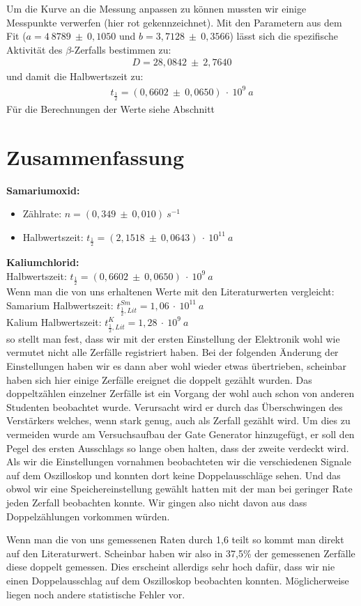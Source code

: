 \documentclass[12pt]{article}
\begin{document}
Um die Kurve an die Messung anpassen zu können mussten wir einige Messpunkte verwerfen (hier rot gekennzeichnet).
Mit den Parametern aus dem Fit ($a = 4~8789~\pm~0,1050$ und $b = 3,7128~\pm~0,3566$) lässt sich die spezifische Aktivität des $\beta$-Zerfalls bestimmen zu:
\begin{align*}
 D = 28,0842~\pm~2,7640
\end{align*}
und damit die Halbwertszeit zu:
\begin{align*}
 t_{\frac{1}{2}} = (0,6602~\pm~0,0650)~\cdot~10^9~a
\end{align*}
Für die Berechnungen der Werte siehe Abschnitt %
\newpage
\section{Zusammenfassung}
\textbf{Samariumoxid:} \\
\begin{itemize}
 \item Zählrate: $n = (0,349~\pm~0,010)~s^{-1}$
 \item Halbwertszeit: $t_{\frac{1}{2}} = (2,1518~\pm~0,0643)~\cdot~10^{11}~a$
\end{itemize}

\textbf{Kaliumchlorid:} \\
Halbwertszeit: $t_{\frac{1}{2}} = (0,6602~\pm~0,0650)~\cdot~10^9~a$\\

Wenn man die von uns erhaltenen Werte mit den Literaturwerten vergleicht:
Samarium Halbwertszeit: $t_{\frac{1}{2}, Lit}^{Sm} = 1,06~\cdot~10^{11}~a$\\
Kalium Halbwertszeit: $t_{\frac{1}{2}, Lit}^K = 1,28~\cdot~10^{9}~a$\\
so stellt man fest, dass wir mit der ersten Einstellung der Elektronik wohl wie vermutet nicht alle Zerfälle registriert haben. Bei der folgenden Änderung der Einstellungen haben wir es dann aber wohl wieder etwas übertrieben, scheinbar haben sich hier einige Zerfälle ereignet die doppelt gezählt wurden.
Das doppeltzählen einzelner Zerfälle ist ein Vorgang der wohl auch schon von anderen Studenten beobachtet wurde. Verursacht wird er durch das Überschwingen des Verstärkers welches, wenn stark genug, auch als Zerfall gezählt wird. Um dies zu vermeiden wurde am Versuchsaufbau der Gate Generator hinzugefügt, er soll den Pegel des ersten Ausschlags so lange oben halten, dass der zweite verdeckt wird. Als wir die Einstellungen vornahmen beobachteten wir die verschiedenen Signale auf dem Oszilloskop und konnten dort keine Doppelausschläge sehen. Und das obwol wir eine Speichereinstellung gewählt hatten mit der man bei geringer Rate jeden Zerfall beobachten konnte. Wir gingen also nicht davon aus dass Doppelzählungen vorkommen würden.

Wenn man die von uns gemessenen Raten durch 1,6 teilt so kommt man direkt auf den Literaturwert. Scheinbar haben wir also in 37,5\% der gemessenen Zerfälle diese doppelt gemessen. 
Dies erscheint allerdigs sehr hoch dafür, dass wir nie einen Doppelausschlag auf dem Oszilloskop beobachten konnten. Möglicherweise liegen noch andere statistische Fehler vor.
\end{document}
